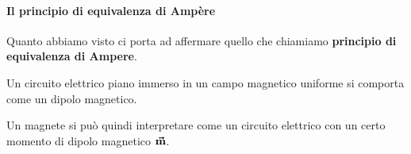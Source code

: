 \paragraph{Il principio di equivalenza di Ampère}
Quanto abbiamo visto ci porta ad affermare quello che chiamiamo \textbf{principio di equivalenza di Ampere}.
\begin{theoremaqed}
	Un circuito elettrico piano immerso in un campo magnetico uniforme si comporta come un dipolo magnetico.
\end{theoremaqed}%
Un magnete si può quindi interpretare come un circuito elettrico con un certo momento di dipolo magnetico $\vb*{\va{m}}$.
